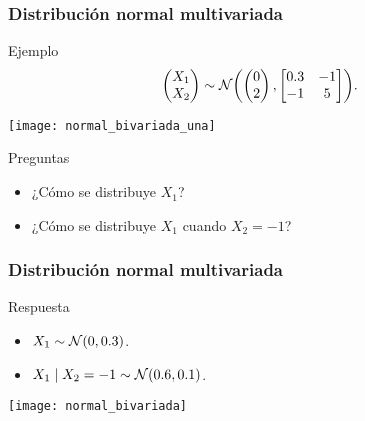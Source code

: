 \documentclass[table]{beamer}
\begin{document}
\begin{frame}
    \frametitle{Distribución normal multivariada}
    \begin{exampleblock}{Ejemplo}
        \begin{equation*}
            \begin{pmatrix} X_{1} \\ X_{2} \end{pmatrix} \sim \normal{\begin{pmatrix} 0 \\ 2 \end{pmatrix}}{\begin{bmatrix} 0.3 & -1 \\ -1 & 5 \end{bmatrix}} .
        \end{equation*}
    \end{exampleblock}
    \begin{center}
        \texttt{[image: normal\_bivariada\_una]}
    \end{center}
    \begin{block}{Preguntas}
        \begin{itemize}
            \item ¿Cómo se distribuye $X_{1}$?
            \item ¿Cómo se distribuye $X_{1}$ cuando $X_{2} = -1$?
        \end{itemize}
    \end{block}
\end{frame}

\begin{frame}
    \frametitle{Distribución normal multivariada}
    \begin{block}{Respuesta}
        \begin{itemize}
            \item $X_{1} \sim \normal{0}{0.3}$.
            \item $X_{1} \mid X_{2} = -1 \sim \normal{0.6}{0.1}$.
        \end{itemize}
    \end{block}
    \begin{center}
        \texttt{[image: normal\_bivariada]}
    \end{center}
\end{frame}
\end{document}
